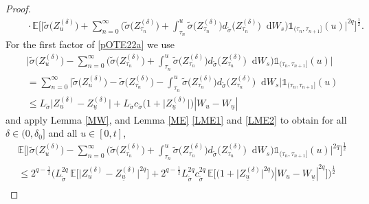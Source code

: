 \documentclass[11pt,a4paper]{article}
\numberwithin{equation}{section}
\theoremstyle{definition}
\newcommand{\E}{{\mathbb{E}}}
\newcommand{\diff}{\mathop{}\!\mathrm{d}}
\begin{document}
\begin{proof}
\begin{equation}
\begin{aligned}
    &\quad \cdot \E\Big[\Big| \widetilde\sigma\big(Z^{(\delta)}_{u} \big)+ \sum_{n=0}^{\infty} \Big( \widetilde\sigma \big(Z^{(\delta)}_{\tau_n}\big) + \int_{\tau_n}^u \widetilde\sigma \big(Z^{(\delta)}_{\tau_n}\big)d_{\widetilde\sigma} \big(Z^{(\delta)}_{\tau_n}\big)\diff W_s \Big)\mathds{1}_{(\tau_n,\tau_{n+1}]}(u)\Big|^{2q}\Big]^{\frac{1}{2}}.
    \end{aligned}
\end{equation}
For the first factor of \eqref{pOTE22a} we use
\begin{equation}\label{pOTE23}
    \begin{aligned}
    &\Big| \widetilde\sigma\big(Z^{(\delta)}_{u} \big)- \sum_{n=0}^{\infty} \Big( \widetilde\sigma \big(Z^{(\delta)}_{\tau_n}\big) + \int_{\tau_n}^u \widetilde\sigma \big(Z^{(\delta)}_{\tau_n}\big)d_{\widetilde\sigma} \big(Z^{(\delta)}_{\tau_n}\big)\diff W_s \Big)\mathds{1}_{(\tau_n,\tau_{n+1}]}(u) \Big|\\
    &= \sum_{n=0}^{\infty} \Big| \widetilde\sigma\big(Z^{(\delta)}_{u} \big)- \widetilde\sigma \big(Z^{(\delta)}_{\tau_n}\big) - \int_{\tau_n}^u \widetilde\sigma \big(Z^{(\delta)}_{\tau_n}\big)d_{\widetilde\sigma} \big(Z^{(\delta)}_{\tau_n}\big)\diff W_s \Big|\mathds{1}_{(\tau_n,\tau_{n+1}]}(u) \\
    &\leq  L_{\widetilde\sigma} \big| Z^{(\delta)}_{u} -Z^{(\delta)}_{\underline u}\big| + L_{\widetilde\sigma} c_{\widetilde\sigma} \big(1+ \big| Z^{(\delta)}_{\underline u}\big|\big) |W_u-W_{\underline u}|
    \end{aligned}
\end{equation}
and apply Lemma \ref{MW}, and Lemma \ref{ME} \eqref{LME1} and \eqref{LME2} to obtain for all $\delta\in(0,\delta_0]$ and all $u\in[0,t]$,
\begin{equation}\label{pOTE23a}
    \begin{aligned}
    &\E\Big[\Big| \widetilde\sigma\big(Z^{(\delta)}_{u} \big)- \sum_{n=0}^{\infty} \Big( \widetilde\sigma \big(Z^{(\delta)}_{\tau_n}\big) + \int_{\tau_n}^u \widetilde\sigma \big(Z^{(\delta)}_{\tau_n}\big)d_{\widetilde\sigma} \big(Z^{(\delta)}_{\tau_n}\big)\diff W_s \Big)\mathds{1}_{(\tau_n,\tau_{n+1}]}(u) \Big|^{2q}\Big]^{\frac{1}{2}}\\
    &\leq 2^{q-\frac{1}{2}}\Big( L_{\widetilde\sigma}^{2q}\, \E\Big[  \big| Z^{(\delta)}_{u} -Z^{(\delta)}_{\underline u}\big|^{2q} \Big] 
    + 2^{q-\frac{1}{2}} L_{\widetilde\sigma}^{2q} c_{\widetilde\sigma}^{2q}\, \E\Big[ \big(1+ \big| Z^{(\delta)}_{\underline u}\big|^{2q}\big) |W_u-W_{\underline u}|^{2q}\Big]\Big)^\frac{1}{2}\\

\end{aligned}
\end{equation}
\end{proof}
\end{document}
